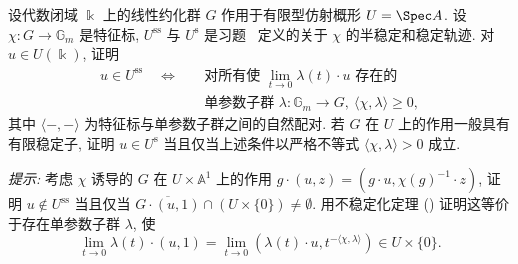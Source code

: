 \begin{exercise}\label{src:8.4.9}
设代数闭域 $\Bbbk$ 上的线性约化群 $G$ 作用于有限型仿射概形 $U=\Spec A$. 设 $\chi:G\to\mathbb G_m$ 是特征标, $U^{\mathrm{ss}}$ 与 $U^{\mathrm s}$ 是习题~ 定义的关于 $\chi$ 的半稳定和稳定轨迹. 对 $u\in U(\Bbbk)$, 证明
\[
\begin{aligned}
u\in U^{\mathrm{ss}}\quad\Longleftrightarrow\quad&\text{对所有使 }\lim_{t\to0}\lambda(t)\cdot u\text{ 存在的}\\
&\text{单参数子群 }\lambda:\mathbb G_m\to G,\ \langle\chi,\lambda\rangle\geq0,
\end{aligned}
\]
其中 $\langle-,-\rangle$ 为特征标与单参数子群之间的自然配对. 若 $G$ 在 $U$ 上的作用一般具有有限稳定子, 证明 $u\in U^{\mathrm s}$ 当且仅当上述条件以严格不等式 $\langle\chi,\lambda\rangle>0$ 成立.

\textit{提示:} 考虑 $\chi$ 诱导的 $G$ 在 $U\times\mathbb A^1$ 上的作用 $g\cdot(u,z)=(g\cdot u,\chi(g)^{-1}\cdot z)$, 证明 $u\notin U^{\mathrm{ss}}$ 当且仅当 $\overline{G\cdot(u,1)}\cap(U\times\{0\})\ne\emptyset$. 用不稳定化定理 () 证明这等价于存在单参数子群 $\lambda$, 使
\[
\lim_{t\to0}\lambda(t)\cdot(u,1)=\lim_{t\to0}(\lambda(t)\cdot u,t^{-\langle\chi,\lambda\rangle})\in U\times\{0\}.
\]
\end{exercise}

